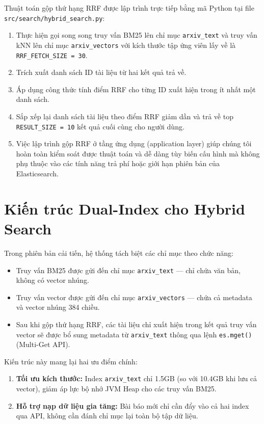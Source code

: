 Thuật toán gộp thứ hạng RRF được lập trình trực tiếp bằng mã Python tại file \texttt{src/search/hybrid\_search.py}:
\begin{enumerate}
    \item Thực hiện gọi song song truy vấn BM25 lên chỉ mục \texttt{arxiv\_text} và truy vấn kNN lên chỉ mục \texttt{arxiv\_vectors} với kích thước tập ứng viên lấy về là \texttt{RRF\_FETCH\_SIZE = 30}.
    \item Trích xuất danh sách ID tài liệu từ hai kết quả trả về.
    \item Áp dụng công thức tính điểm RRF cho từng ID xuất hiện trong ít nhất một danh sách.
    \item Sắp xếp lại danh sách tài liệu theo điểm RRF giảm dần và trả về top \texttt{RESULT\_SIZE = 10} kết quả cuối cùng cho người dùng.
    \item Việc lập trình gộp RRF ở tầng ứng dụng (application layer) giúp chúng tôi hoàn toàn kiểm soát được thuật toán và dễ dàng tùy biến cấu hình mà không phụ thuộc vào các tính năng trả phí hoặc giới hạn phiên bản của Elasticsearch.
\end{enumerate}

\section{Kiến trúc Dual-Index cho Hybrid Search}
Trong phiên bản cải tiến, hệ thống tách biệt các chỉ mục theo chức năng:
\begin{itemize}
    \item Truy vấn BM25 được gửi đến chỉ mục \texttt{arxiv\_text} --- chỉ chứa văn bản, không có vector nhúng.
    \item Truy vấn vector được gửi đến chỉ mục \texttt{arxiv\_vectors} --- chứa cả metadata và vector nhúng 384 chiều.
    \item Sau khi gộp thứ hạng RRF, các tài liệu chỉ xuất hiện trong kết quả truy vấn vector sẽ được bổ sung metadata từ \texttt{arxiv\_text} thông qua lệnh \texttt{es.mget()} (Multi-Get API).
\end{itemize}

Kiến trúc này mang lại hai ưu điểm chính:
\begin{enumerate}
    \item \textbf{Tối ưu kích thước:} Index \texttt{arxiv\_text} chỉ 1.5GB (so với 10.4GB khi lưu cả vector), giảm áp lực bộ nhớ JVM Heap cho các truy vấn BM25.
    \item \textbf{Hỗ trợ nạp dữ liệu gia tăng:} Bài báo mới chỉ cần đẩy vào cả hai index qua API, không cần đánh chỉ mục lại toàn bộ tập dữ liệu.
\end{enumerate}
